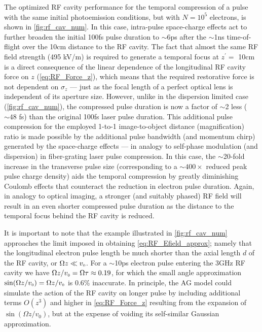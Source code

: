 The optimized RF cavity performance for the temporal compression of a pulse with the same initial photoemission conditions, but with $N = 10^{5}$ electrons, is shown in \ref{fig:rf_cav_num}.
In this case, intra-pulse space-charge effects act to further broaden the initial 100fs pulse duration to $\sim$6ps after the $\sim$1ns time-of-flight over the 10cm distance to the RF cavity.
The fact that almost the same RF field strength (495 kV/m) is required to generate a temporal focus at $z^{\prime} = $ 10cm is a direct consequence of the linear dependence of the longitudinal RF cavity force on $z$ (\ref{eq:RF_Force_z}), which means that the required restorative force is not dependent on $\sigma_{z}$ --- just as the focal length of a perfect optical lens is independent of its aperture size.
However, unlike in the dispersion limited case (\ref{fig:rf_cav_num}), the compressed pulse duration is now a factor of $\sim$2 less ($\sim 48$ fs) than the original 100fs laser pulse duration.
This additional pulse compression for the employed 1-to-1 image-to-object distance (magnification) ratio is made possible by the additional pulse bandwidth (and momentum chirp) generated by the space-charge effects --- in analogy to self-phase modulation (and dispersion) in fiber-grating laser pulse compression.\cite{strickland_compression_1985}
In this case, the $\sim$20-fold increase in the transverse pulse size (corresponding to a $\sim400\times$ reduced peak pulse charge density) aids the temporal compression by greatly diminishing Coulomb effects that counteract the reduction in electron pulse duration.
Again, in analogy to optical imaging, a stronger (and suitably phased) RF field will result in an even shorter compressed pulse duration as the distance to the temporal focus behind the RF cavity is reduced.

It is important to note that the example illustrated in \ref{fig:rf_cav_num} approaches the limit imposed in obtaining \ref{eq:RF_Efield_approx}; namely that the longitudinal electron pulse length be much shorter than the axial length $d$ of the RF cavity, or $ \Omega z \ll v_{{\scriptscriptstyle 0}} $.
For a $\sim$10ps electron pulse entering the 3GHz RF cavity we have $ \Omega z / v_{{\scriptscriptstyle 0}} = \Omega \tau \approx 0.19 $, for which the small angle approximation $ \sin ( \Omega z / v_{{\scriptscriptstyle 0}} ) = \Omega z / v_{{\scriptscriptstyle 0}} $ is 0.6\% inaccurate.
In principle, the AG model could simulate the action of the RF cavity on longer pulse by including additional terms $O( z^{3} )$ and higher in \ref{eq:RF_Force_z} resulting from the expansion of $ \sin \left ( \Omega z / v_{0} \right ) $, but at the expense of voiding its self-similar Gaussian approximation.

